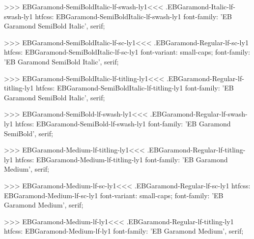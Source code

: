 {{>>>
\<EBGaramond-SemiBoldItalic-lf-swash-ly1\><<<
.EBGaramond-Italic-lf-swash-ly1
htfcss:  EBGaramond-SemiBoldItalic-lf-swash-ly1  font-family: 'EB Garamond SemiBold Italic', serif;

>>>
\<EBGaramond-SemiBoldItalic-lf-sc-ly1\><<<
.EBGaramond-Regular-lf-sc-ly1
htfcss:  EBGaramond-SemiBoldItalic-lf-sc-ly1  font-variant: small-caps; font-family: 'EB Garamond SemiBold Italic', serif;

>>>
\<EBGaramond-SemiBoldItalic-lf-titling-ly1\><<<
.EBGaramond-Regular-lf-titling-ly1
htfcss:  EBGaramond-SemiBoldItalic-lf-titling-ly1  font-family: 'EB Garamond SemiBold Italic', serif;

>>>
\<EBGaramond-SemiBold-lf-swash-ly1\><<<
.EBGaramond-Regular-lf-swash-ly1
htfcss:  EBGaramond-SemiBold-lf-swash-ly1  font-family: 'EB Garamond SemiBold', serif;

>>>
\<EBGaramond-Medium-lf-titling-ly1\><<<
.EBGaramond-Regular-lf-titling-ly1
htfcss:  EBGaramond-Medium-lf-titling-ly1  font-family: 'EB Garamond Medium', serif;

>>>
\<EBGaramond-Medium-lf-sc-ly1\><<<
.EBGaramond-Regular-lf-sc-ly1
htfcss:  EBGaramond-Medium-lf-sc-ly1  font-variant: small-caps; font-family: 'EB Garamond Medium', serif;

>>>
\<EBGaramond-Medium-lf-ly1\><<<
.EBGaramond-Regular-lf-titling-ly1
htfcss:  EBGaramond-Medium-lf-ly1  font-family: 'EB Garamond Medium', serif;

}}
